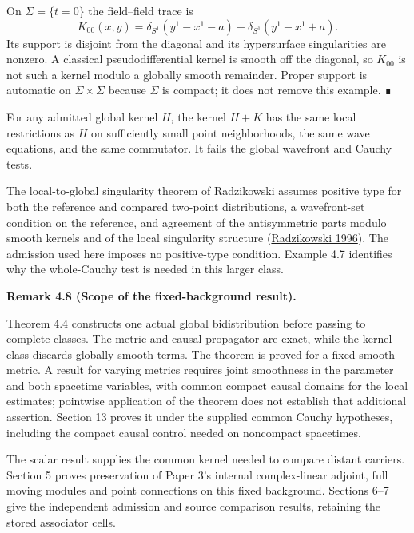 \documentclass[
  english,
  11pt,
  reqno]{amsart}
\makeatletter
\newcommand{\pandocstatementheading}[1]{%
  \par\if@nobreak\else
    \addpenalty{\@beginparpenalty}%
    \addvspace{.5\baselineskip plus .2\baselineskip minus .2\baselineskip}%
  \fi
  {\normalfont\bfseries #1\par}%
  \nobreak\@afterindenttrue\@afterheading
}
\makeatother
\begin{document}
On \(\Sigma=\{t=0\}\) the field--field trace is \[
K_{00}(x,y)
=\delta_{S^1}(y^1-x^1-a)
+\delta_{S^1}(y^1-x^1+a).
\] Its support is disjoint from the diagonal and its hypersurface
singularities are nonzero. A classical pseudodifferential kernel is
smooth off the diagonal, so \(K_{00}\) is not such a kernel modulo a
globally smooth remainder. Proper support is automatic on
\(\Sigma\times\Sigma\) because \(\Sigma\) is compact; it does not remove
this example. ∎

For any admitted global kernel \(H\), the kernel \(H+K\) has the same
local restrictions as \(H\) on sufficiently small point neighborhoods,
the same wave equations, and the same commutator. It fails the global
wavefront and Cauchy tests.

The local-to-global singularity theorem of Radzikowski assumes positive
type for both the reference and compared two-point distributions, a
wavefront-set condition on the reference, and agreement of the
antisymmetric parts modulo smooth kernels and of the local singularity
structure (\hyperref[ref-RadzikowskiVerch1996]{Radzikowski 1996}). The
admission used here imposes no positive-type condition. Example 4.7
identifies why the whole-Cauchy test is needed in this larger class.

\pandocstatementheading{\protect{}\label{rem:p4-wave-proof-scope}Remark 4.8 (Scope of the fixed-background result).}

Theorem 4.4 constructs one actual global bidistribution before passing
to complete classes. The metric and causal propagator are exact, while
the kernel class discards globally smooth terms. The theorem is proved
for a fixed smooth metric. A result for varying metrics requires joint
smoothness in the parameter and both spacetime variables, with common
compact causal domains for the local estimates; pointwise application of
the theorem does not establish that additional assertion. Section 13
proves it under the supplied common Cauchy hypotheses, including the
compact causal control needed on noncompact spacetimes.

The scalar result supplies the common kernel needed to compare distant
carriers. Section 5 proves preservation of Paper 3's internal
complex-linear adjoint, full moving modules and point connections on
this fixed background. Sections 6--7 give the independent admission and
source comparison results, retaining the stored associator cells.

\protect{}\label{sec:global-carrier-completion}
\end{document}
